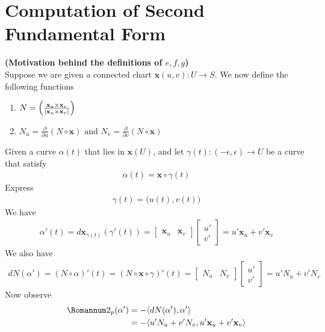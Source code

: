 \documentclass{report}
\begin{document}
\section{Computation of Second Fundamental Form}
\begin{mdframed}
\textbf{(Motivation behind the definitions of $e,f,g$)}\\

Suppose we are given a connected chart $\textbf{x}(u,v):U\rightarrow S$. We now define the following functions 
\begin{enumerate}[label=(\alph*)]
\item $N= \Big(\frac{\textbf{x}_u \times \textbf{x}_v}{\left|\textbf{x}_u \times \textbf{x}_v\right|} \Big)$
\item $N_u= \frac{\partial}{\partial u}(N \circ \textbf{x})\text{ and }N_v=\frac{\partial }{\partial v}(N\circ \textbf{x})$ 
\end{enumerate}
Given a curve $\alpha (t)$ that lies in $\textbf{x}(U)$, and let $\gamma (t):(-\epsilon ,\epsilon )\rightarrow U$ be a curve that satisfy 
\begin{align*}
\alpha (t)=\textbf{x}\circ \gamma (t)
\end{align*}
Express 
\begin{align*}
\gamma (t)=\big(u(t),v(t) \big)
\end{align*}
We have 
\begin{align*}
\alpha '(t)=d\textbf{x}_{\gamma (t)}(\gamma '(t))=\begin{bmatrix}
  \textbf{x}_u & \textbf{x}_v
\end{bmatrix}\begin{bmatrix}
u'\\
v'
\end{bmatrix}= u'\textbf{x}_u + v' \textbf{x}_v
\end{align*}
We also have 
\begin{align*}
dN(\alpha ')=(N\circ \alpha  )'(t)=(N\circ \textbf{x}\circ \gamma )'(t)=\begin{bmatrix}
  N_u & N_v
\end{bmatrix}\begin{bmatrix}
u' \\
v'
\end{bmatrix}=u'N_u + v'N_v
\end{align*}
Now observe 
\begin{align*}
\Sec_p(\alpha ')&=-\langle dN(\alpha '),\alpha '\rangle \\
&=-\langle u'N_u+v'N_v, u'\textbf{x}_u+v'\textbf{x}_v\rangle \\

\end{align*}
\end{mdframed}
\end{document}
